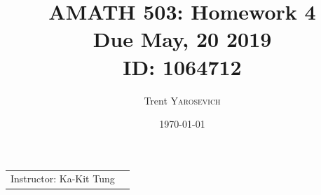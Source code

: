 \documentclass{article}
\title{AMATH 503: Homework 4 \\Due May, 20 2019 \\ ID: 1064712} %
\author{Trent \textsc{Yarosevich}} %
\date{\today} %
\begin{document}
\maketitle %
\setlength\parindent{1cm}

\begin{center}
\begin{tabular}{l r}
Instructor: Ka-Kit Tung %
\end{tabular}
\end{center}
\doublespacing

\end{document}
